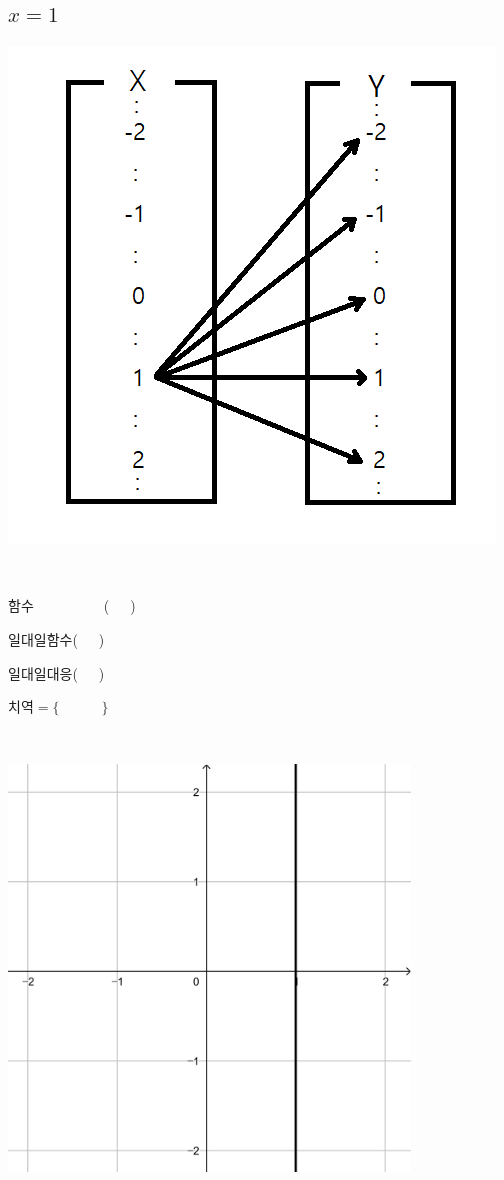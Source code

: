 \documentclass[a4paper]{oblivoir}
\begin{document}
\subsection{\(x=1\)}
%
\begin{minipage}{0.4\textwidth}
\includegraphics[width=\textwidth]{x=1}
\end{minipage}
~
\begin{minipage}{0.20\textwidth}
함수~~~~~~~~~~(~~~)\par\bigskip
일대일함수(~~~)\par\bigskip
일대일대응(~~~)\par\bigskip
치역\(=\{\qquad\quad\}\)
\end{minipage}
~
\begin{minipage}{0.35\textwidth}
\includegraphics[width=0.8\textwidth]{x=1-}
\end{minipage}
\end{document}
